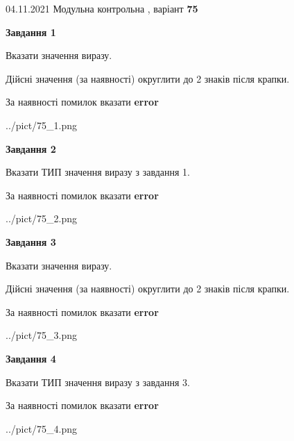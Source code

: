 \documentclass[11pt, ukrainian]{article}
\begin{document}
{04.11.2021 Модульна контрольна , варіант  \No \textbf { 75 }\par}
{
\begin {large}
{\begin {center}\textbf{Завдання 1}\end {center}}\par
Вказати значення виразу. \par
Дійсні значення (за наявності) округлити до 2 знаків після крапки. \par
За наявності помилок вказати \textbf{error}

\begin{center}
	{../pict/75_1.png}
\end{center}
\newpage

{\begin {center}\textbf{Завдання 2}\end {center}}\par
Вказати ТИП значення виразу з завдання 1. \par
За наявності помилок вказати \textbf{error}

\begin{center}
	{../pict/75_2.png}
\end{center}
\newpage

{\begin {center}\textbf{Завдання 3}\end {center}}\par
Вказати значення виразу. \par
Дійсні значення (за наявності) округлити до 2 знаків після крапки. \par
За наявності помилок вказати \textbf{error}

\begin{center}
	{../pict/75_3.png}
\end{center}
\newpage

{\begin {center}\textbf{Завдання 4}\end {center}}\par
Вказати ТИП значення виразу з завдання 3. \par
За наявності помилок вказати \textbf{error}

\begin{center}
	{../pict/75_4.png}
\end{center}
\newpage


\end{large}}
\end{document}
